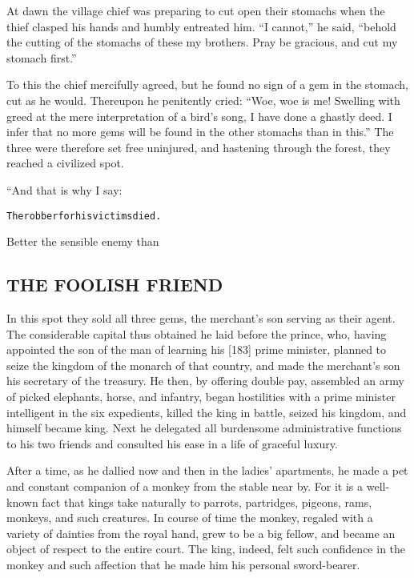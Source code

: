 \documentclass{article}
\renewenvironment{verbatim}{\begin{alltt}\normalfont\begin{centering}}{\end{centering}\end{alltt}}
\begin{document}
At dawn the village chief was preparing to cut open their stomachs
when the thief clasped his hands and humbly entreated him.
``I cannot,'' he said,
``behold the cutting of the stomachs of these my brothers. Pray be gracious, and cut my stomach first.''

To this the chief mercifully agreed, but he found no sign of a gem
in the stomach, cut as he would. Thereupon he penitently cried:
``Woe, woe is me! Swelling with greed at the mere interpretation of a bird's song, I have done a ghastly deed. I infer that no more gems will be found in the other stomachs than in this.''
The three were therefore set free uninjured, and hastening through
the forest, they reached a civilized spot.

“And that is why I say:

\begin{verbatim}
The robber for his victims died.
\end{verbatim}
Better the sensible enemy than

\subsection{THE FOOLISH FRIEND}

In this spot they sold all three gems, the merchant's son serving
as their agent. The considerable capital thus obtained he laid
before the prince, who, having appointed the son of the man of
learning his [183] prime minister, planned to seize the kingdom of
the monarch of that country, and made the merchant's son his
secretary of the treasury. He then, by offering double pay,
assembled an army of picked elephants, horse, and infantry, began
hostilities with a prime minister intelligent in the six
expedients, killed the king in battle, seized his kingdom, and
himself became king. Next he delegated all burdensome
administrative functions to his two friends and consulted his ease
in a life of graceful luxury.

After a time, as he dallied now and then in the ladies' apartments,
he made a pet and constant companion of a monkey from the stable
near by. For it is a well-known fact that kings take naturally to
parrots, partridges, pigeons, rams, monkeys, and such creatures. In
course of time the monkey, regaled with a variety of dainties from
the royal hand, grew to be a big fellow, and became an object of
respect to the entire court. The king, indeed, felt such confidence
in the monkey and such affection that he made him his personal
sword-bearer.
\end{document}
